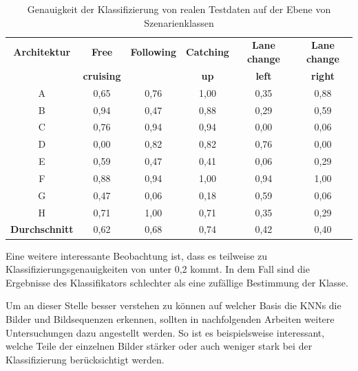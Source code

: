 \begin{table}[h]
\small
\centering
\def\arraystretch{1.4}
\begin{tabular}{c c c c c c}
\textbf{Architektur} & \textbf{Free} & \textbf{Following} & \textbf{Catching} & \textbf{Lane change} & \textbf{Lane change} \\
 & \textbf{cruising} & & \textbf{up} & \textbf{left} & \textbf{right} \\
\hline
A & 0,65 & 0,76 & 1,00 & 0,35 & 0,88 \\
B & 0,94 & 0,47 & 0,88 & 0,29 & 0,59 \\
C & 0,76 & 0,94 & 0,94 & 0,00 & 0,06 \\
D & 0,00 & 0,82 & 0,82 & 0,76 & 0,00 \\
E & 0,59 & 0,47 & 0,41 & 0,06 & 0,29 \\
F & 0,88 & 0,94 & 1,00 & 0,94 & 1,00 \\
G & 0,47 & 0,06 & 0,18 & 0,59 & 0,06 \\
H & 0,71 & 1,00 & 0,71 & 0,35 & 0,29 \\
\hline
\textbf{Durchschnitt} & 0,62 & 0,68 & 0,74 & 0,42 & 0,40 \\
\hline
\end{tabular}
\caption{Genauigkeit der Klassifizierung von realen Testdaten auf der Ebene von Szenarienklassen}
\label{tab_ergebnis_szenarien}
\end{table}

Eine weitere interessante Beobachtung ist, dass es teilweise zu Klassifizierungsgenauigkeiten von unter 0,2 kommt. In dem Fall sind die Ergebnisse des Klassifikators schlechter als eine zufällige Bestimmung der Klasse.

Um an dieser Stelle besser verstehen zu können auf welcher Basis die \acp{KNN} die Bilder und Bildsequenzen erkennen, sollten in nachfolgenden Arbeiten weitere Untersuchungen dazu angestellt werden. So ist es beispielsweise interessant, welche Teile der einzelnen Bilder stärker oder auch weniger stark bei der Klassifizierung berücksichtigt werden.








